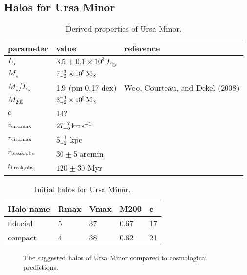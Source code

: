 \subsection{Halos for Ursa Minor}\label{halos-for-ursa-minor}

\begin{table*}[t]
\centering
\caption[Derived Properties of Ursa Minor]{Derived properties of Ursa Minor. }
\label{tbl:umi_derived_props}
\begin{tabular}{lll}
\toprule
parameter & value & reference\\
\midrule
$L_\star$ & $3.5 \pm 0.1 \times 10^5\,L_\odot$ & \\
$M_\star$ & $7_{-2}^{+3} \times 10^5\,{\rm M}_{\odot}$ & \\
$M_\star / L_\star$ & 1.9 (pm 0.17 dex) & Woo, Courteau, and Dekel (2008)\\
$M_{200}$ & $3_{-2}^{+4} \times 10^9\,{\rm M}_{\odot}$ & \\
$c$ & 14? & \\
$v_{\rm circ, max}$ & $27_{-6}^{+7}\,{\rm km\,s^{-1}}$ & \\
$r_{\rm circ, max}$ & $5_{-2}^{+1}$ kpc & \\
$r_{\rm break, obs}$ & $30 \pm 5$ arcmin & \\
$t_{\rm break, obs}$ & $120\pm30$ Myr & \\
\bottomrule
\end{tabular}
\end{table*}

\begin{table*}[t]
\centering
\caption[Ursa Minor Initial Halos]{Initial halos for Ursa Minor. }
\label{tbl:umi_ini_halos}
\begin{tabular}{lllll}
\toprule
Halo name & Rmax & Vmax & M200 & c\\
\midrule
fiducial & 5 & 37 & 0.67 & 17\\
compact & 4 & 38 & 0.62 & 21\\
\bottomrule
\end{tabular}
\end{table*}

\begin{figure}
\centering
{}
\caption[Ursa Minor initial halos]{The suggested halos of Ursa Minor
compared to cosmological predictions.}
\end{figure}

\subsection{}\label{section-1}

